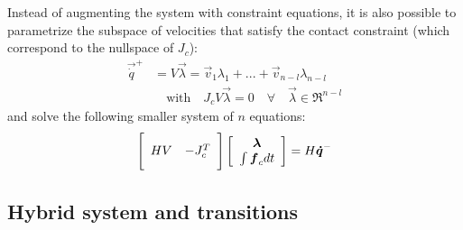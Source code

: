 Instead of augmenting the system with constraint equations,  it is also possible to parametrize the subspace of velocities that satisfy the contact constraint (which correspond to the nullspace of $J_c$):
%
\begin{align}
\vec{\dot{q}}^+ &= V \vec{\lambda} = \vec{v}_1 \lambda_1  + ... + \vec{v}_{n-l} \lambda_{n-l} \\
& \quad \text{with} \quad J_c V \vec{\lambda} = 0 \quad \forall \quad \vec{\lambda} \in \Re^{n-l}
\end{align}
%
and solve the following smaller system of $n$ equations:
%
\begin{align}
\Bigg[ \begin{array}{c c } 	H V & -J_c^T  	\end{array} \Bigg] \left[ \begin{array}{c} \vec{\lambda}  \\ \int{ \vec{f}_c dt }\end{array} \right] = H \vec{\dot{q}}^-
\label{eq:manipulator_impact_eom}
\end{align}


\subsection{Hybrid system and transitions}
\label{sec:impact}





